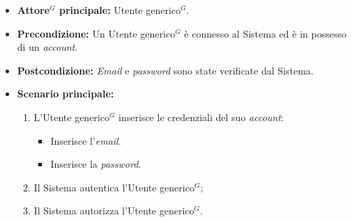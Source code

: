 \label{usecase:Effettua accesso tradizionale}
\begin{itemize}

	\item \textbf{\gls{Attore}$^G$ principale:} \gls{Utente generico}$^G$.

	\item \textbf{Precondizione:} Un \gls{Utente generico}$^G$ è connesso al Sistema ed è in possesso di un \textit{account}.

	\item \textbf{Postcondizione:} \textit{Email} e \textit{password} sono state verificate dal Sistema.

	\item \textbf{Scenario principale:}
	\begin{enumerate}
		\item L'\gls{Utente generico}$^G$ inserisce le credenziali del suo \textit{account}:
		\begin{itemize}
            \item Inserisce l'\textit{email}.
            \item Inserisce la \textit{password}.
        \end{itemize}
		\item Il Sistema autentica l'\gls{Utente generico}$^G$;
		\item Il Sistema autorizza l'\gls{Utente generico}$^G$.
	\end{enumerate}

\end{itemize}